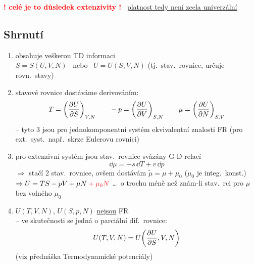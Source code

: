 \textcolor{Red}{\textbf{! celé je to důsledek extenzivity !}} \ \underline{platnost tedy není zcela univerzální}

\subsection*{Shrnutí}
\begin{enumerate}[label=\arabic*)]
  \item {} obsahuje veškerou TD informaci \\
  \quad $S = S(U,V,N)$ \ nebo \ $U = U(S,V,N)$ \qquad \textcolor{NavyBlue}{(tj.\ stav.\ rovnice, určuje rovn.\ stavy)}
  \item stavové rovnice dostáváme derivováním:
  \[
    T = \left(\pdv{U}{S}\right)_{V,N} \qquad -p = \left(\pdv{U}{V}\right)_{S,N} \qquad \mu = \left(\pdv{U}{N}\right)_{S,V}
  \]
  -- tyto 3 jsou pro jednokomponentní systém ekvivalentní znalosti FR \textcolor{NavyBlue}{(pro ext.\ syst.\ např.\ skrze Eulerovu rovnici)}
  \item pro extenzivní systém jsou stav.\ rovnice svázány G-D relací
  \[
    \dd\mu = -s\,\dd T + v\,\dd p
  \]
  \textcolor{NavyBlue}{$\Rightarrow$ stačí 2 stav.\ rovnice, ovšem dostávám $\tilde\mu = \mu + \mu_0$ ($\mu_0$ je integ.\ konst.) \\
  $\Rightarrow U = TS - pV + \mu N \textcolor{Red}{{}+\mu_0N}$ \dots\ o trochu méně než znám-li stav.\ rci pro $\mu$ bez volného $\mu_0$}
  \item $U(T,V,N)$, $U(S,p,N)$ \underline{nejsou} FR \\
  -- ve skutečnosti se jedná o parciální dif.\ rovnice:
  \[
    U(T,V,N) = U\!\left(\pdv{U}{S}, V, N\right)
  \]
  (viz přednáška Termodynamické potenciály)
\end{enumerate}


